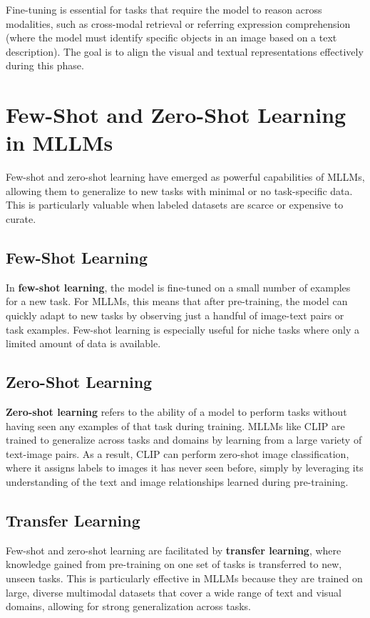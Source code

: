 Fine-tuning is essential for tasks that require the model to reason across modalities, such as cross-modal retrieval or referring expression comprehension (where the model must identify specific objects in an image based on a text description). The goal is to align the visual and textual representations effectively during this phase.

\section{Few-Shot and Zero-Shot Learning in MLLMs}

Few-shot and zero-shot learning have emerged as powerful capabilities of MLLMs, allowing them to generalize to new tasks with minimal or no task-specific data. This is particularly valuable when labeled datasets are scarce or expensive to curate.

\subsection{Few-Shot Learning}

In \textbf{few-shot learning}, the model is fine-tuned on a small number of examples for a new task. For MLLMs, this means that after pre-training, the model can quickly adapt to new tasks by observing just a handful of image-text pairs or task examples. Few-shot learning is especially useful for niche tasks where only a limited amount of data is available.

\subsection{Zero-Shot Learning}

\textbf{Zero-shot learning} refers to the ability of a model to perform tasks without having seen any examples of that task during training. MLLMs like CLIP are trained to generalize across tasks and domains by learning from a large variety of text-image pairs. As a result, CLIP can perform zero-shot image classification, where it assigns labels to images it has never seen before, simply by leveraging its understanding of the text and image relationships learned during pre-training.

\subsection{Transfer Learning}

Few-shot and zero-shot learning are facilitated by \textbf{transfer learning}, where knowledge gained from pre-training on one set of tasks is transferred to new, unseen tasks. This is particularly effective in MLLMs because they are trained on large, diverse multimodal datasets that cover a wide range of text and visual domains, allowing for strong generalization across tasks.

